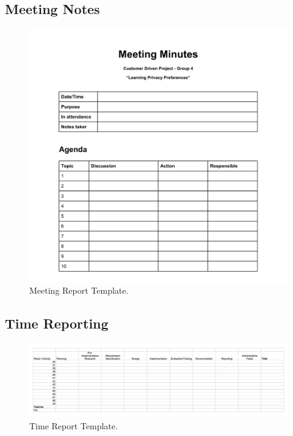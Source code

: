 \subsection{Meeting Notes}
\begin{figure}[hbp]
\begin{center}
\includegraphics[width = \textwidth/3*2]{Appendix/meetingreportTemp.jpg}
\caption{Meeting Report Template.}
\label{MeetingReportTemplate}
\end{center}
\end{figure}
\newpage

\subsection{Time Reporting}
\begin{figure}[hbp]
\begin{center}
\includegraphics[width = \textwidth]{Appendix/timereportTemp.jpg}
\caption{Time Report Template.}
\label{TimeReportTemplate}
\end{center}
\end{figure}

